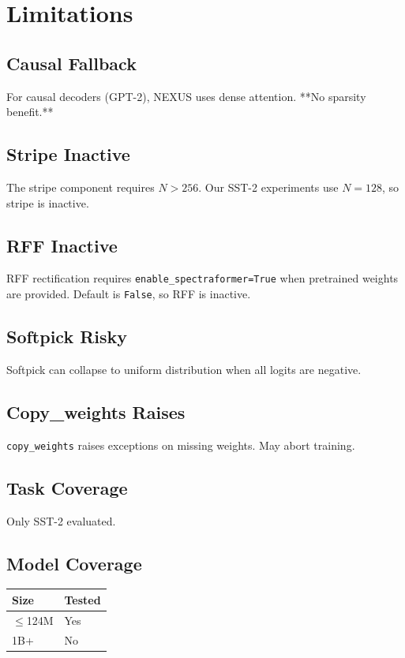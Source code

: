 \section{Limitations}

\subsection{Causal Fallback}

For causal decoders (GPT-2), NEXUS uses dense attention. **No sparsity 
benefit.**

\subsection{Stripe Inactive}

The stripe component requires $N > 256$. Our SST-2 experiments use 
$N = 128$, so stripe is inactive.

\subsection{RFF Inactive}

RFF rectification requires \texttt{enable\_spectraformer=True} when pretrained 
weights are provided. Default is \texttt{False}, so RFF is inactive.

\subsection{Softpick Risky}

Softpick can collapse to uniform distribution when all logits are negative.

\subsection{Copy\_weights Raises}

\texttt{copy\_weights} raises exceptions on missing weights. May abort training.

\subsection{Task Coverage}

Only SST-2 evaluated.

\subsection{Model Coverage}

\begin{table}[H]
\centering
\small
\begin{tabular}{ll}
\toprule
\textbf{Size} & \textbf{Tested} \\
\midrule
$\le$124M & Yes \\
1B+ & No \\
\bottomrule
\end{tabular}
\end{table}

